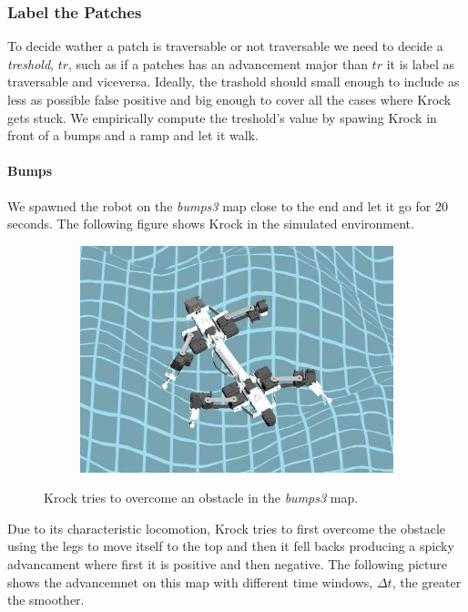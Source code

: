 \documentclass[../document.tex]{subfiles}
\begin{document}
\subsubsection{Label the Patches}
To decide wather a patch is traversable or not traversable we need to decide a \emph{treshold}, $tr$, such as if a patches has an advancement major than $tr$ it is label as traversable and viceversa. Ideally, the trashold should small enough to include as less as possible false positive and big enough to cover all the cases where Krock gets stuck. We empirically compute the treshold's value by spawing Krock in front of a bumps and a ramp and let it walk.
\paragraph{Bumps} We spawned the robot on the \emph{bumps3} map close to the end and let it go for 20 seconds. The following figure shows Krock in the simulated environment.

\begin{figure}[H]
\centering
    \begin{subfigure}[b]{0.45\textwidth}
    \includegraphics[width=\linewidth]{../img/3/find_tr/krock-bumps.jpg}
    \end{subfigure}
\caption{Krock tries to overcome an obstacle in the \emph{bumps3} map.}
\end{figure}

Due to its characteristic locomotion, Krock tries to first overcome the obstacle using the legs to move itself to the top and then it fell backs producing a spicky advancament where first it is positive and then negative. The following picture shows the advancemnet on this map with different time windows, $\Delta t$, the greater the smoother.
\end{document}
